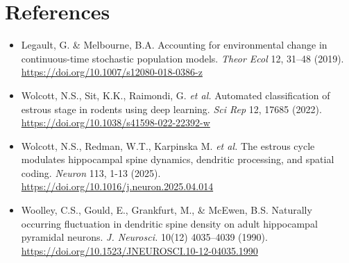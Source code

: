 \documentclass[11pt,letterpaper, onecolumn]{exam}
\begin{document}
\section*{References}
\begin{itemize}[label={}]
\item Legault, G. \& Melbourne, B.A. Accounting for environmental change in continuous-time stochastic population models. \textit{Theor Ecol} 12, 31--48 (2019). \url{https://doi.org/10.1007/s12080-018-0386-z}
\item Wolcott, N.S., Sit, K.K., Raimondi, G. \textit{et al.} Automated classification of estrous stage in rodents using deep learning. \textit{Sci Rep} 12, 17685 (2022). \url{https://doi.org/10.1038/s41598-022-22392-w}
\item Wolcott, N.S., Redman, W.T., Karpinska M. \textit{et al.} The estrous cycle modulates hippocampal spine dynamics, dendritic processing, and spatial coding. \textit{Neuron} 113, 1-13 (2025). \url{https://doi.org/10.1016/j.neuron.2025.04.014}
\item Woolley, C.S., Gould, E., Grankfurt, M., \& McEwen, B.S. Naturally occurring fluctuation in dendritic spine density on adult hippocampal pyramidal neurons. \textit{J. Neurosci.} 10(12) 4035--4039 (1990). \url{https://doi.org/10.1523/JNEUROSCI.10-12-04035.1990}
\end{itemize}
\end{document}
